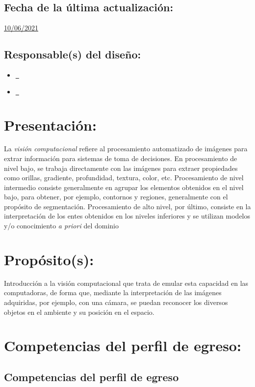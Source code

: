 \documentclass[10 pt]{article}
\begin{document}
\subsection{Fecha de la \'{u}ltima actualizaci\'{o}n:} \underline{10/06/2021}
\subsection{Responsable(s) del dise\~{n}o:}
\begin{itemize}[label={}]
\item \underline{\narturo~\arturo}
\item \underline{\nelisa~\elisa}
\end{itemize}
\newpage
\section{Presentaci\'{o}n:}

La {\em visi\'{o}n computacional} refiere al procesamiento
automatizado de im\'{a}genes para extrar informaci\'{o}n para sistemas
de toma de decisiones.  En procesamiento de nivel bajo, se trabaja
directamente con las im\'{a}genes para extraer propiedades como
orillas, gradiente, profundidad, textura, color, etc. Procesamiento de
nivel intermedio consiste generalmente en agrupar los elementos
obtenidos en el nivel bajo, para obtener, por ejemplo, contornos y
regiones, generalmente con el prop\'{o}sito de
segmentaci\'{o}n. Procesamiento de alto nivel, por \'{u}ltimo,
consiste en la interpretaci\'{o}n de los entes obtenidos en los
niveles inferiores y se utilizan modelos y/o conocimiento {\em a
  priori} del dominio

\section{Prop\'{o}sito(s):}

Introducci\'{o}n a la visi\'{o}n computacional que trata de emular esta
capacidad en las computadoras, de forma que, mediante la
interpretaci\'{o}n de las im\'{a}genes adquiridas, por ejemplo, con una
c\'{a}mara, se puedan reconocer los diversos objetos en el ambiente y su
posici\'{o}n en el espacio.

\section{Competencias del perfil de egreso:}
\subsection{Competencias del perfil de egreso}
\end{document}
